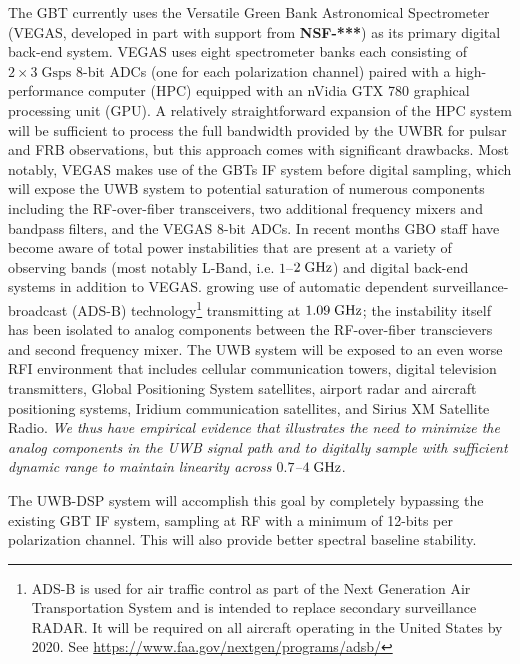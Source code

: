 \documentclass[10pt]{myNSF}
\begin{document}
 The GBT currently uses the Versatile
Green Bank Astronomical Spectrometer (VEGAS, developed in part with
support from \textbf{NSF-***}) as its primary digital back-end system.
VEGAS uses eight spectrometer banks each consisting of $2 \times 3\;
\mathrm{Gsps}$ 8-bit ADCs (one for each polarization channel) paired
with a high-performance computer (HPC) equipped with an nVidia GTX 780
graphical processing unit (GPU).  A relatively straightforward
expansion of the HPC system will be sufficient to process the full
bandwidth provided by the UWBR for pulsar and FRB observations, but
this approach comes with significant drawbacks.  Most notably, VEGAS
makes use of the GBTs IF system before digital sampling, which will
expose the UWB system to potential saturation of numerous components
including the RF-over-fiber transceivers, two additional frequency
mixers and bandpass filters, and the VEGAS 8-bit ADCs.  In recent
months GBO staff have become aware of total power instabilities that
are present at a variety of observing bands (most notably L-Band,
i.e. $1$--$2\; \textrm{GHz}$) and digital back-end systems in addition to
VEGAS.  growing use of automatic dependent surveillance-broadcast
(ADS-B) technology\footnote{ADS-B is used for air traffic control as
  part of the Next Generation Air Transportation System and is
  intended to replace secondary surveillance RADAR.  It will be
  required on all aircraft operating in the United States by 2020.
  See \url{https://www.faa.gov/nextgen/programs/adsb/}} transmitting
at $1.09\; \textrm{GHz}$; the instability itself has been isolated to analog
components between the RF-over-fiber transcievers and second frequency
mixer.  The UWB system will be exposed to an even worse RFI
environment that includes cellular communication towers, digital
television transmitters, Global Positioning System satellites, airport
radar and aircraft positioning systems, Iridium communication
satellites, and Sirius XM Satellite Radio.  \emph{We thus have
  empirical evidence that illustrates the need to minimize the analog
  components in the UWB signal path and to digitally sample with
  sufficient dynamic range to maintain linearity across $0.7$--$4\;
  \textrm{GHz}$}.

The UWB-DSP system will accomplish this goal by completely bypassing
the existing GBT IF system, sampling at RF with a minimum of 12-bits
per polarization channel.  This will also provide better spectral
baseline stability.
\end{document}
